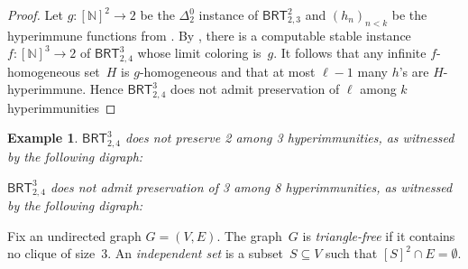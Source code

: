 \documentclass{article}
\newcommand{\BRT}[0]{\mathsf{BRT}}
\newcommand{\NN}[0]{\mathbb{N}}
\numberwithin{theorem}{section}
\newtheorem{corollary}[theorem]{Corollary}
\newtheorem{example}[theorem]{Example}
\begin{document}
\begin{proof}
Let $g : [\NN]^2 \to 2$ be the $\Delta^0_2$ instance of $\BRT^2_{2,3}$ and $(h_n)_{n < k}$ be the hyperimmune functions from . By , there is a computable stable instance $f : [\NN]^3 \to 2$ of $\BRT^3_{2,4}$ whose limit coloring is~$g$. It follows that any infinite $f$-homogeneous set~$H$ is $g$-homogeneous and that at most $\ell-1$ many $h$'s are $H$-hyperimmune. Hence $\BRT^3_{2,4}$ does not admit preservation of $\ell$ among $k$ hyperimmunities
\end{proof}

\begin{example}
$\BRT^3_{2,4}$ does not preserve 2 among 3 hyperimmunities, as witnessed by the following digraph:
\begin{center}
\end{center}
$\BRT^3_{2,4}$ does not admit preservation of 3 among 8 hyperimmunities, as witnessed by the following digraph:
\begin{center}
\end{center}
\end{example}

Fix an undirected graph $G = (V, E)$. The graph~$G$ is \emph{triangle-free} if it contains no clique of size~3. An \emph{independent set} is a subset~$S \subseteq V$ such that $[S]^2 \cap E = \emptyset$.
\end{document}
